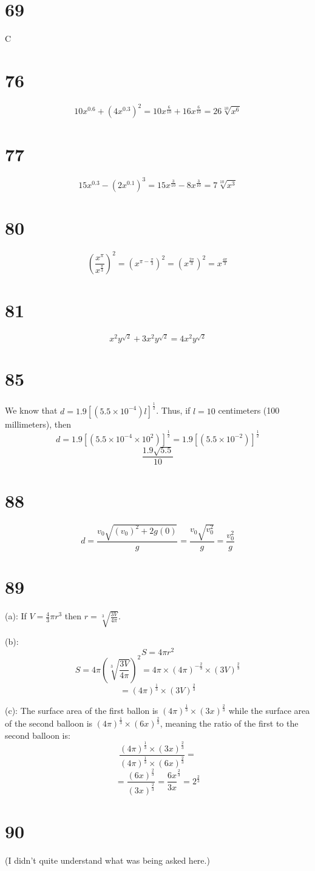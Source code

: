 \documentclass{article}
\theoremstyle{definition}
\begin{document}
\section*{69}
C

\section*{76}
\[ 10x^{0.6}+(4x^{0.3})^2=10x^\frac{6}{10}+16x^\frac{6}{10}=26\sqrt[10]{x^6} \]

\section*{77}
\[ 15x^{0.3}-(2x^{0.1})^3=15x^\frac{3}{10}-8x^\frac{3}{10}=7\sqrt[10]{x^3} \] 

\section*{80}
\[ (\frac{x^\pi}{x^\frac{\pi}{3}})^2=(x^{\pi-\frac{\pi}{3}})^2=(x^\frac{2\pi}{3})^2=x^\frac{4\pi}{3} \]

\section*{81}
\[ x^2y^{\sqrt{2}}+3x^2y^{\sqrt{2}}=4x^2y^{\sqrt{2}} \]

\section*{85}
We know that $d=1.9[(5.5\times 10^{-4})l]^\frac{1}{2}$. Thus, if $l=10$ centimeters (100 millimeters), then
\[ d=1.9[(5.5\times 10^{-4}\times 10^2)]^\frac{1}{2}=1.9[(5.5\times 10^{-2})]^\frac{1}{2} \]
\[ \frac{1.9\sqrt{5.5}}{10} \]

\section*{88}
\[ d=\dfrac{v_0\sqrt{(v_0)^2+2g(0)}}{g}=\dfrac{v_0\sqrt{v_0^2}}{g}=\dfrac{v_0^2}{g} \]

\section*{89}
(a): If $V=\frac{4}{3}\pi r^3$ then $r=\sqrt[3]{\frac{3V}{4\pi}}$.\newline


(b): \[ S=4\pi r^2 \] \[ S=4\pi(\sqrt[3]{\frac{3V}{4\pi}})^2=4\pi\times (4\pi)^{-\frac{2}{3}}\times (3V)^\frac{2}{3} \]
\[ =(4\pi)^\frac{1}{3}\times (3V)^\frac{2}{3} \]

(c): The surface area of the first ballon is $(4\pi)^\frac{1}{3}\times (3x)^\frac{2}{3}$ while the surface area of the second balloon is 
$ (4\pi)^\frac{1}{3}\times (6x)^\frac{2}{3}$, meaning the ratio of the first to the second balloon is:
\[ \frac{(4\pi)^\frac{1}{3}\times (3x)^\frac{2}{3}}{(4\pi)^\frac{1}{3}\times (6x)^\frac{2}{3}}= \]
\[ =\frac{(6x)^\frac{2}{3}}{(3x)^\frac{2}{3}}=\frac{6x}{3x}^\frac{2}{3}=2^\frac{2}{3} \]

\section*{90}
(I didn't quite understand what was being asked here.)
\end{document}
